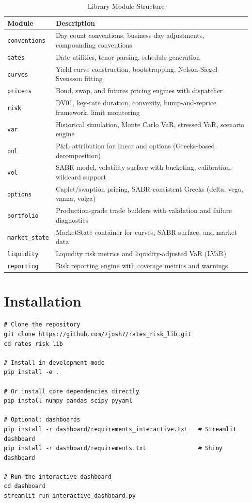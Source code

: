 \documentclass[12pt,a4paper]{report}
\newcommand{\code}[1]{\texttt{#1}}
\begin{document}
\begin{table}[H]
\centering
\begin{tabular}{@{}lp{10cm}@{}}
\toprule
\textbf{Module} & \textbf{Description} \\
\midrule
\code{conventions} & Day count conventions, business day adjustments, compounding conventions \\
\code{dates} & Date utilities, tenor parsing, schedule generation \\
\code{curves} & Yield curve construction, bootstrapping, Nelson-Siegel-Svensson fitting \\
\code{pricers} & Bond, swap, and futures pricing engines with dispatcher \\
\code{risk} & DV01, key-rate duration, convexity, bump-and-reprice framework, limit monitoring \\
\code{var} & Historical simulation, Monte Carlo VaR, stressed VaR, scenario engine \\
\code{pnl} & P\&L attribution for linear and options (Greeks-based decomposition) \\
\code{vol} & SABR model, volatility surface with bucketing, calibration, wildcard support \\
\code{options} & Caplet/swaption pricing, SABR-consistent Greeks (delta, vega, vanna, volga) \\
\code{portfolio} & Production-grade trade builders with validation and failure diagnostics \\
\code{market\_state} & MarketState container for curves, SABR surface, and market data \\
\code{liquidity} & Liquidity risk metrics and liquidity-adjusted VaR (LVaR) \\
\code{reporting} & Risk reporting engine with coverage metrics and warnings \\
\bottomrule
\end{tabular}
\caption{Library Module Structure}
\end{table}

\section{Installation}

\begin{lstlisting}
# Clone the repository
git clone https://github.com/7josh7/rates_risk_lib.git
cd rates_risk_lib

# Install in development mode
pip install -e .

# Or install core dependencies directly
pip install numpy pandas scipy pyyaml

# Optional: dashboards
pip install -r dashboard/requirements_interactive.txt   # Streamlit dashboard
pip install -r dashboard/requirements.txt               # Shiny dashboard

# Run the interactive dashboard
cd dashboard
streamlit run interactive_dashboard.py
\end{lstlisting}
\end{document}

